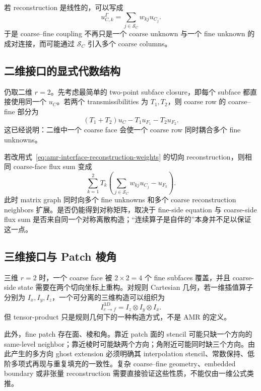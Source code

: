 若 reconstruction 是线性的，可以写成
\begin{equation}
u_{C,k}^{\Gamma}
=\sum_{j\in\mathcal S_C}w_{kj}u_{C_j}.
\label{eq:amr-interface-reconstruction-weights}
\end{equation}
于是 coarse--fine coupling 不再只是一个 coarse unknown 与一个 fine unknown 的成对连接，而可能通过 $\mathcal S_C$ 引入多个 coarse columns。

\subsection{二维接口的显式代数结构}

仍取二维 $r=2$。先考虑最简单的 two-point subface closure，即每个 subface 都直接使用同一个 $u_C$。若两个 transmissibilities 为 $T_1,T_2$，则 coarse row 的 coarse--fine 部分为
\begin{equation}
\boxed{
(T_1+T_2)u_C
-T_1u_{F_1}
-T_2u_{F_2}.
}
\label{eq:amr-two-dimensional-coarse-row}
\end{equation}
这已经说明：二维中一个 coarse face 会使一个 coarse row 同时耦合多个 fine unknowns。

若改用式~\eqref{eq:amr-interface-reconstruction-weights} 的切向 reconstruction，则相同 coarse-face flux sum 变成
\begin{equation}
\sum_{k=1}^{2}
T_k
\left(
\sum_{j\in\mathcal S_C}w_{kj}u_{C_j}
-u_{F_k}
\right).
\label{eq:amr-reconstructed-coarse-row}
\end{equation}
此时 matrix graph 同时向多个 fine unknowns 和多个 coarse reconstruction neighbors 扩展。是否仍能得到对称矩阵，取决于 fine-side equation 与 coarse-side flux sum 是否来自同一个对称离散构造；“连续算子是自伴的”本身并不足以保证这一点。

\subsection{三维接口与 Patch 棱角}

三维 $r=2$ 时，一个 coarse face 被 $2\times2=4$ 个 fine subfaces 覆盖，并且 coarse-side state 需要在两个切向坐标上重构。对规则 Cartesian 几何，若一维插值算子分别为 $I_x,I_y,I_z$，一个可分离的三维构造可以组织为
\begin{equation}
I_{c\rightarrow f}^{3D}
=I_z\otimes I_y\otimes I_x.
\label{eq:amr-three-dimensional-interpolation-tensor}
\end{equation}
但 tensor-product 只是规则几何下的一种构造方式，不是 AMR 的定义。

此外，fine patch 存在面、棱和角。靠近 patch 面的 stencil 可能只缺一个方向的 same-level neighbor；靠近棱时可能缺两个方向；角附近可能同时缺三个方向。由此产生的多方向 ghost extension 必须明确其 interpolation stencil、常数保持、低阶多项式再现与重复填充的一致性。复杂 coarse--fine geometry、embedded boundary 或非张量 reconstruction 需要直接验证这些性质，不能仅由一维公式类推。

